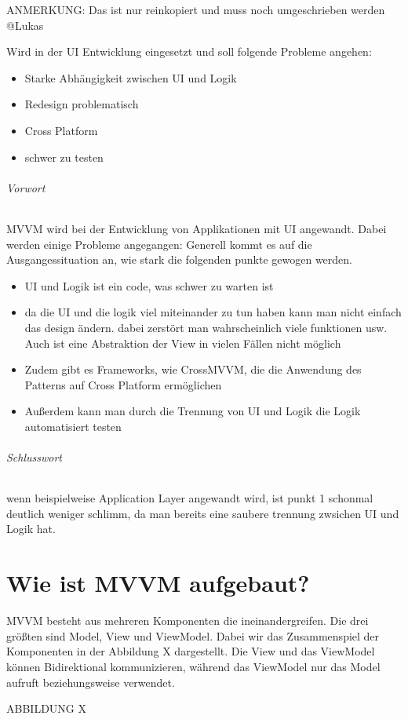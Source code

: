 \documentclass[titlepage=false,12pt]{scrreprt}
\begin{document}
ANMERKUNG: Das ist nur reinkopiert und muss noch umgeschrieben werden @Lukas

Wird in der UI Entwicklung eingesetzt und soll folgende Probleme angehen:
	
\begin{itemize}
	\item Starke Abhängigkeit zwischen UI und Logik
	\item Redesign problematisch
	\item Cross Platform
	\item schwer zu testen
\end{itemize}

\subparagraph{Vorwort}


MVVM wird bei der Entwicklung von Applikationen mit UI angewandt.
Dabei werden einige Probleme angegangen:
Generell kommt es auf die Ausgangessituation an, wie stark die folgenden punkte gewogen werden.

\begin{itemize}
	\item UI und Logik ist ein code, was schwer zu warten ist 
	\item da die UI und die logik viel miteinander zu tun haben kann man nicht einfach das design ändern. dabei zerstört      man wahrscheinlich viele funktionen usw.
	      Auch ist eine Abstraktion der View in vielen Fällen nicht möglich
	\item Zudem gibt es Frameworks, wie CrossMVVM, die die Anwendung des Patterns auf Cross Platform ermöglichen
	\item Außerdem kann man durch die Trennung von UI und Logik die Logik automatisiert testen
\end{itemize}
\subparagraph{Schlusswort}
wenn beispielweise Application Layer angewandt wird, ist punkt 1 schonmal deutlich weniger schlimm, da man bereits eine saubere trennung zwsichen UI und Logik hat.

\chapter{Wie ist MVVM aufgebaut?}

MVVM besteht aus mehreren Komponenten die ineinandergreifen. Die drei 
größten sind Model, View und ViewModel. Dabei wir das Zusammenspiel 
der Komponenten in der Abbildung X dargestellt. Die View und das ViewModel 
können Bidirektional kommunizieren, während das ViewModel nur das Model
aufruft beziehungsweise verwendet.

ABBILDUNG X
\end{document}

